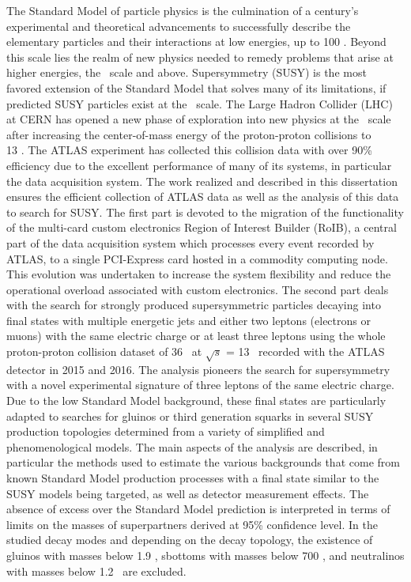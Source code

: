 The Standard Model of particle physics is the culmination of a century's experimental and theoretical advancements
to successfully describe the elementary particles and their interactions at low energies, up to 100 \GeV. 
Beyond this scale lies the realm of new physics needed to remedy problems that arise at higher energies, the \TeV~scale and above. 
Supersymmetry (SUSY) is the most favored extension of the Standard Model that solves many of its limitations, if predicted 
SUSY particles exist at the \TeV~scale.
The Large Hadron Collider (LHC) at CERN has opened a new phase of exploration into new physics at the \TeV~scale 
after increasing the center-of-mass energy of the proton-proton collisions to \\13 \TeV. 
The ATLAS experiment has collected this collision data with over 90\% efficiency due to the excellent performance 
of many of its systems, in particular the data acquisition system.
The work realized and described in this dissertation ensures the efficient collection of ATLAS data as well as the analysis 
of this data to search for SUSY.
The first part is devoted to the migration of the functionality of the multi-card custom electronics 
Region of Interest Builder (RoIB), a central part of the data acquisition system which processes every event recorded by ATLAS, to a single 
PCI-Express card hosted in a commodity computing node. This evolution was undertaken to 
increase the system flexibility and reduce the operational overload associated with custom electronics.
The second part deals with the search for strongly produced supersymmetric particles decaying into final 
states with multiple energetic jets and either two leptons (electrons or muons) with the same electric 
charge or at least three leptons using the whole proton-proton collision dataset of 36 \ifb~at 
$\sqrt{s}$ = 13 \TeV~recorded with the ATLAS detector in 2015 and 2016.
The analysis pioneers the search for supersymmetry with a novel experimental signature of three leptons of the same 
electric charge.
Due to the low Standard Model background, these final states are particularly adapted to searches for gluinos or third generation
squarks in several SUSY production topologies determined from a variety of simplified and phenomenological models.
The main aspects of the analysis are described, in particular the methods used to estimate the various backgrounds that come 
from known Standard Model production processes with a final state similar to the SUSY models being targeted, 
as well as detector measurement effects.
The absence of excess over the Standard Model prediction  is interpreted in 
terms of limits on the masses of superpartners derived at 95\% confidence 
level. In the studied decay modes and depending on the decay topology, the existence of gluinos with masses below
1.9 \TeV, sbottoms with masses below 700 \GeV, and neutralinos with masses 
below 1.2 \TeV~are excluded.
